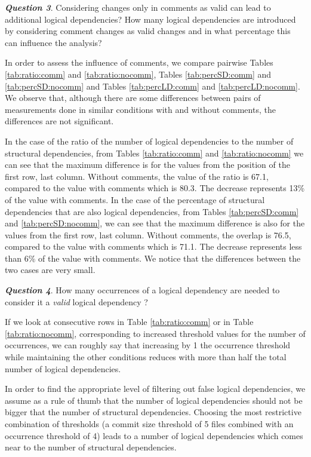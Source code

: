 \documentclass[a4paper,twoside]{article}
\begin{document}
\textit{\textbf{Question 3}}. Considering changes only in comments as valid can lead to additional logical dependencies? How many logical dependencies are introduced by considering comment changes as valid changes and in what percentage this can influence the analysis?

In order to assess the influence of comments, we compare pairwise Tables \ref{tab:ratio:comm} and \ref{tab:ratio:nocomm},  
Tables \ref{tab:percSD:comm} and \ref{tab:percSD:nocomm} and Tables \ref{tab:percLD:comm} and \ref{tab:percLD:nocomm}. 
We observe that, although there are some differences between pairs of measurements done in similar conditions with and without comments, the differences are not significant.

In the case of the ratio of the number of logical dependencies to the number of structural dependencies, from Tables \ref{tab:ratio:comm} and \ref{tab:ratio:nocomm} we can see that the maximum difference is for the values from the position of the first row, last column. Without comments, the value of the ratio is 67.1, compared to the value with comments which is 80.3. The decrease represents 13\% of the value with comments. In the case of the percentage of structural dependencies that are also logical dependencies, from Tables \ref{tab:percSD:comm} and \ref{tab:percSD:nocomm}, we can see that the maximum difference is also for the values from the first row, last column. Without comments, the overlap is 76.5, compared to the value with comments which is 71.1.  The decrease represents less than 6\% of the value with comments. We notice that the differences between the two cases are very small. %



\textit{\textbf{Question 4}}. How many occurrences of a logical dependency are needed to consider it a \textit{valid} logical dependency ? 

If we look at consecutive rows in Table \ref{tab:ratio:comm} or in Table \ref{tab:ratio:nocomm}, corresponding to increased threshold values for the number of occurrences, we can roughly say that  increasing by 1 the occurrence threshold while maintaining the other conditions reduces with more than half the total number of logical dependencies.  

In order to find the appropriate level of filtering out false logical dependencies, we assume as a rule of thumb that the number of logical dependencies should not be bigger that the number of structural dependencies. Choosing the most restrictive combination of thresholds (a commit size threshold of 5 files combined with an occurrence threshold of 4) leads to a number of logical dependencies which comes near to the number of structural dependencies.
\end{document}
